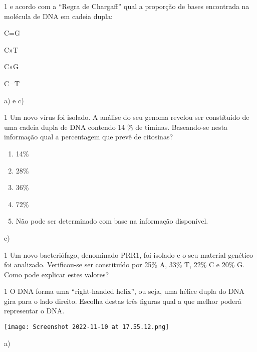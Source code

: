 \documentclass[\mainfilename]{subfiles}
\begin{document}
\begin{questionBox}1{ %
    e acordo com a ``Regra de Chargaff'' qual a proporção de bases encontrada na molécula de DNA em cadeia dupla:
} %
    \begin{enumerate}
        \begin{multicols}{2}
            \item C=G 
            \item C»T 
            \item C»G 
            \item C=T
        \end{multicols}
    \end{enumerate}

    a) e c)
\end{questionBox}

\begin{questionBox}1{ %
    Um novo vírus foi isolado. A análise do seu genoma revelou ser constítuido de uma cadeia dupla de DNA contendo 14 \% de timinas. Baseando-se nesta informação qual a percentagem que prevê de citosinas?
} %
    \begin{enumerate}
        \item 14\%
        \item 28\%
        \item 36\%
        \item 72\%
        \item Não pode ser determinado com base na informação disponível.
    \end{enumerate}

    c)

\end{questionBox}

\begin{questionBox}1{ %
    Um novo bacteriófago, denominado PRR1, foi isolado e o seu material genético foi analizado. Verificou-se ser constituído por 25\% A, 33\% T, 22\% C e 20\% G. Como pode explicar estes valores?
} %
    
\end{questionBox}

\begin{questionBox}1{ %
    O DNA forma uma “right-handed helix”, ou seja, uma hélice dupla do DNA gira para o lado direito. Escolha destas três figuras qual a que melhor poderá representar o DNA.
} %
    
    \begin{center}
        \texttt{[image: Screenshot 2022-11-10 at 17.55.12.png]}
    \end{center}

    a)

\end{questionBox}
\end{document}
